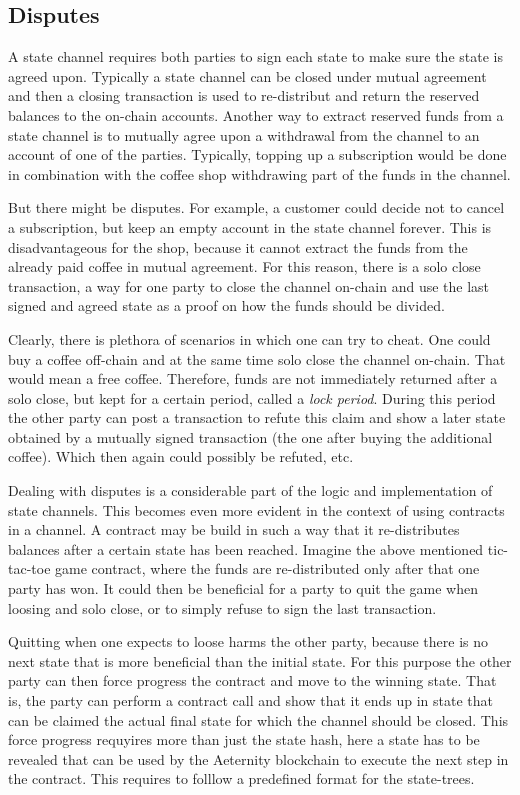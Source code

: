 \subsection{Disputes}

A state channel requires both parties to sign each state to make
sure the state is agreed upon. Typically a state channel can be closed
under mutual agreement and then a closing transaction is used to
re-distribut and return the reserved balances to the on-chain
accounts. Another way to extract reserved funds from a state channel
is to mutually agree upon a withdrawal from the channel to an account of
one of the parties. Typically, topping up a subscription would be done
in combination with the coffee shop withdrawing part of the funds in
the channel.

But there might be disputes. For example, a customer
could decide not to cancel a subscription, but keep an empty account
in the state channel forever. This is disadvantageous for the shop,
because it cannot extract the funds from the already paid coffee in
mutual agreement. For this reason, there is a solo close transaction,
a way for one party to close the channel on-chain and use the last
signed and agreed state as a proof on how the funds should be divided.

Clearly, there is plethora of scenarios in which one can try to
cheat. One could buy a coffee off-chain and at the same time solo
close the channel on-chain. That would mean a free coffee. Therefore,
funds are not immediately returned after a solo close, but kept for a
certain period, called a \textit{lock period}. During this period the
other party can post a transaction to refute this claim and show a
later state obtained by a mutually signed transaction (the one after
buying the additional coffee). Which then again could possibly be
refuted, etc.

Dealing with disputes is a considerable part of the logic and
implementation of state channels. This becomes even more evident in
the context of using contracts in a channel. A contract may be build
in such a way that it re-distributes balances after a certain state has
been reached. Imagine the above mentioned tic-tac-toe game contract,
where the funds are re-distributed only after that one party has
won. It could then be beneficial for a party to quit the
game when loosing and solo close, or to simply refuse to sign the last
transaction.

Quitting when one expects to loose
harms the other party, because there is no next state that is more
beneficial than the initial state. For this purpose the other party
can then force progress the contract and move to the winning
state. That is, the party can perform a contract call and show that it
ends up in state that can be claimed the actual final state for which
the channel should be closed. This force progress requyires more than
just the state hash, here a state has to be revealed that can be used
by the Aeternity blockchain to execute the next step in the
contract. This requires to folllow a predefined format for the state-trees.

